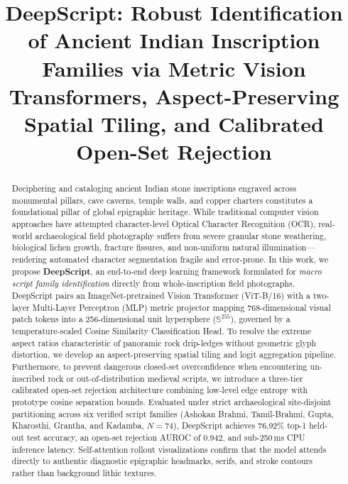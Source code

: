 \documentclass[conference,10pt]{IEEEtran}
\begin{document}
\title{DeepScript: Robust Identification of Ancient Indian Inscription Families via Metric Vision Transformers, Aspect-Preserving Spatial Tiling, and Calibrated Open-Set Rejection}

\author{
}

\maketitle

\begin{abstract}
Deciphering and cataloging ancient Indian stone inscriptions engraved across monumental pillars, cave caverns, temple walls, and copper charters constitutes a foundational pillar of global epigraphic heritage. While traditional computer vision approaches have attempted character-level Optical Character Recognition (OCR), real-world archaeological field photography suffers from severe granular stone weathering, biological lichen growth, fracture fissures, and non-uniform natural illumination---rendering automated character segmentation fragile and error-prone. In this work, we propose \textbf{DeepScript}, an end-to-end deep learning framework formulated for \textit{macro script family identification} directly from whole-inscription field photographs. DeepScript pairs an ImageNet-pretrained Vision Transformer (ViT-B/16) with a two-layer Multi-Layer Perceptron (MLP) metric projector mapping 768-dimensional visual patch tokens into a 256-dimensional unit hypersphere ($\mathbb{S}^{255}$), governed by a temperature-scaled Cosine Similarity Classification Head. To resolve the extreme aspect ratios characteristic of panoramic rock drip-ledges without geometric glyph distortion, we develop an aspect-preserving spatial tiling and logit aggregation pipeline. Furthermore, to prevent dangerous closed-set overconfidence when encountering un-inscribed rock or out-of-distribution medieval scripts, we introduce a three-tier calibrated open-set rejection architecture combining low-level edge entropy with prototype cosine separation bounds. Evaluated under strict archaeological site-disjoint partitioning across six verified script families (Ashokan Brahmi, Tamil-Brahmi, Gupta, Kharosthi, Grantha, and Kadamba, $N=74$), DeepScript achieves 76.92\% top-1 held-out test accuracy, an open-set rejection AUROC of 0.942, and sub-250\,ms CPU inference latency. Self-attention rollout visualizations confirm that the model attends directly to authentic diagnostic epigraphic headmarks, serifs, and stroke contours rather than background lithic textures.
\end{abstract}
\end{document}
